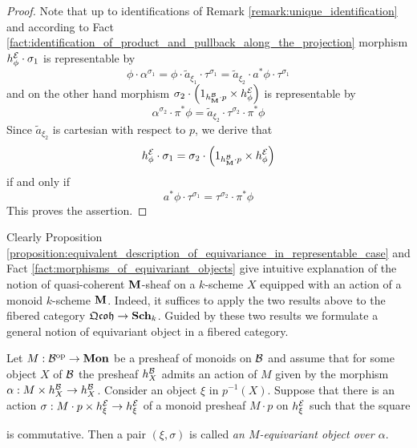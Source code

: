 \begin{proof}
Note that up to identifications of Remark \ref{remark:unique_identification} and according to Fact \ref{fact:identification_of_product_and_pullback_along_the_projection}  morphism $h^{{\mathcal E}}_{\phi}\cdot \sigma_1$ is representable by
$$\phi\cdot \alpha^{\sigma_1} = \phi\cdot \widetilde{a}_{\xi_1}\cdot \tau^{\sigma_1} = \widetilde{a}_{\xi_2}\cdot a^*\phi \cdot \tau^{\sigma_1}$$
and on the other hand morphism $\sigma_2\cdot \left(1_{h^{{\mathcal B}}_{\mathbf{M}}\cdot p}\times h^{{\mathcal E}}_{\phi}\right)$ is representable by
$$\alpha^{\sigma_2}\cdot \pi^*\phi = \widetilde{a}_{\xi_2}\cdot \tau^{\sigma_2}\cdot \pi^*\phi$$
Since $\widetilde{a}_{\xi_2}$ is cartesian with respect to $p$, we derive that
$$h^{{\mathcal E}}_{\phi}\cdot \sigma_1 = \sigma_2\cdot \left(1_{h^{{\mathcal B}}_{\mathbf{M}}\cdot p}\times h^{{\mathcal E}}_{\phi}\right)$$
if and only if
$$a^*\phi \cdot \tau^{\sigma_1} = \tau^{\sigma_2}\cdot \pi^*\phi$$
This proves the assertion.
\end{proof}
\noindent
Clearly Proposition \ref{proposition:equivalent_description_of_equivariance_in_representable_case} and Fact \ref{fact:morphisms_of_equivariant_objects} give intuitive explanation of the notion of quasi-coherent $\mathbf{M}$-sheaf on a $k$-scheme $X$ equipped with an action of a monoid $k$-scheme $\mathbf{M}$. Indeed, it suffices to apply the two results above to the fibered category $\mathfrak{Qcoh} \rightarrow \mathbf{Sch}_k$. Guided by these two results we formulate a general notion of equivariant object in a fibered category.

\begin{definition}
Let $M:{\mathcal B}^{\mathrm{op}}\rightarrow \mathbf{Mon}$ be a presheaf of monoids on ${\mathcal B}$ and assume that for some object $X$ of ${\mathcal B}$ the presheaf $h^{{\mathcal B}}_X$ admits an action of $M$ given by the morphism $\alpha:M\times h^{{\mathcal B}}_X\rightarrow h^{{\mathcal B}}_X$. Consider an object $\xi$ in $p^{-1}(X)$. Suppose that there is an action $\sigma:M\cdot p \times h^{{\mathcal E}}_\xi\rightarrow h^{{\mathcal E}}_\xi$ of a monoid presheaf $M\cdot p$ on $h^{{\mathcal E}}_\xi$ such that the square
\begin{center}
\end{center}
is commutative. Then a pair $(\xi,\sigma)$ is called \textit{an $M$-equivariant object over $\alpha$}.
\end{definition}

